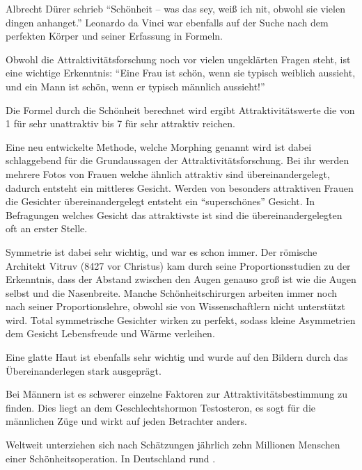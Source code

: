 Albrecht Dürer schrieb \enquote{Schönheit -- was das sey, weiß ich nit, obwohl sie vielen dingen anhanget.}
Leonardo da Vinci war ebenfalls auf der Suche nach dem perfekten Körper und seiner Erfassung in
Formeln.

Obwohl die Attraktivitätsforschung noch vor vielen ungeklärten Fragen steht, ist eine wichtige
Erkenntnis: \enquote{Eine Frau ist schön, wenn sie typisch weiblich aussieht, und ein Mann ist schön, wenn er
typisch männlich aussieht!}

Die Formel durch die Schönheit berechnet wird ergibt Attraktivitätswerte die von 1 für sehr
unattraktiv bis 7 für sehr attraktiv reichen.

Eine neu entwickelte Methode, welche Morphing genannt wird ist dabei schlaggebend für die
Grundaussagen der
Attraktivitätsforschung. Bei ihr werden mehrere Fotos von Frauen welche ähnlich attraktiv sind
übereinandergelegt, dadurch entsteht ein mittleres Gesicht. Werden von besonders attraktiven Frauen
die Gesichter übereinandergelegt entsteht ein \enquote{superschönes} Gesicht. In Befragungen welches Gesicht
das attraktivste ist sind die übereinandergelegten oft an erster Stelle.

Symmetrie ist dabei sehr wichtig, und war es schon immer. Der römische Architekt Vitruv (8427 vor
Christus) kam durch seine Proportionsstudien zu der Erkenntnis, dass der Abstand zwischen den Augen
genauso groß ist wie die Augen selbst und die Nasenbreite.
Manche Schönheitschirurgen arbeiten immer noch nach seiner Proportionslehre, obwohl sie von
Wissenschaftlern nicht unterstützt wird. Total symmetrische Gesichter wirken zu perfekt,
sodass kleine Asymmetrien dem Gesicht Lebensfreude und Wärme verleihen.

Eine glatte Haut ist ebenfalls sehr wichtig und wurde auf den Bildern durch das
Übereinanderlegen stark ausgeprägt.

Bei Männern ist es schwerer einzelne Faktoren zur Attraktivitätsbestimmung zu finden.
Dies liegt an dem Geschlechtshormon Testosteron, es sogt für die männlichen Züge und wirkt auf jeden
Betrachter anders.

Weltweit unterziehen sich nach Schätzungen jährlich zehn Millionen Menschen einer
Schönheitsoperation. In Deutschland rund .

